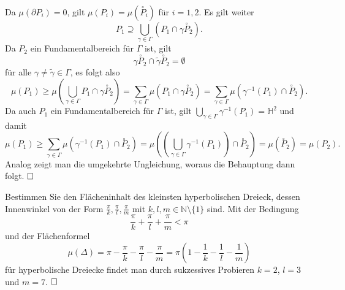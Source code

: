 \documentclass[11pt]{book}
\numberwithin{dummy}{section}
\theoremstyle{nonumberbreak}
\newenvironment{prob}[1][]{\ifthenelse{\equal{#1}{}}{\problem}{\problem[#1]}\rm}{\endproblem}
\newenvironment{sol}[1][]{\ifthenelse{\equal{#1}{}}{\solution}{\solution[#1]}\rm}{\endsolution}
\newcommand{\He}{\mathbb{H}}
\begin{document}
\begin{spacing}{1.4}
\begin{prob}
\begin{sol}
Da $\mu(\partial P_i)=0$, gilt $\mu(P_i)= \mu(\overset{\circ}{P}_i)$ für $i=1,2$. Es gilt weiter 
$$P_1 \supseteq \bigcup_{\gamma \in \Gamma} (P_1 \cap \gamma \overset{\circ}{P}_2).$$
Da $P_2$ ein Fundamentalbereich für $\Gamma$ ist, gilt 
$$\gamma \overset{\circ}{P}_2 \cap \tilde{\gamma} \overset{\circ}{P}_2 = \emptyset$$
für alle $\gamma \neq \tilde{\gamma}\in \Gamma$, es folgt also
$$\mu(P_1)\geqslant \mu\left( \bigcup_{\gamma \in \Gamma} P_1 \cap \gamma \overset{\circ}{P}_2\right) = \sum_{\gamma \in \Gamma} \mu\left(P_1 \cap \gamma \overset{\circ}{P}_2\right) = \sum_{\gamma \in \Gamma} \mu(\gamma^{-1}(P_1) \cap \overset{\circ}{P}_2).$$
Da auch $P_1$ ein Fundamentalbereich für $\Gamma$ ist, gilt $\bigcup_{\gamma \in \Gamma} \gamma^{-1}(P_1) = \He^2$ und damit 
$$\mu(P_1) \geqslant \sum_{\gamma \in \Gamma}\mu(\gamma^{-1}(P_1) \cap \overset{\circ}{P}_2) = \mu\left( \left( \bigcup_{\gamma \in \Gamma} \gamma^{-1}(P_1)\right) \cap \overset{\circ}{P}_2\right) = \mu(\overset{\circ}{P}_2) = \mu(P_2).$$
Analog zeigt man die umgekehrte Ungleichung, woraus die Behauptung dann folgt. $\hfill \Box$
\end{sol}

\end{prob}


\begin{prob}   %
Bestimmen Sie den Flächeninhalt des kleinsten hyperbolischen Dreieck, dessen Innenwinkel von der Form $\frac{\pi}{k}, \frac{\pi}{l}, \frac{\pi}{m}$ mit $k,l,m \in \mathbb{N}\setminus \{1\}$ sind.
\begin{sol}
Mit der Bedingung
$$\frac{\pi}{k} + \frac{\pi}{l} + \frac{\pi}{m} <\pi$$
und der Flächenformel
$$\mu(\Delta)= \pi-\frac{\pi}{k}-\frac{\pi}{l}-\frac{\pi}{m} = \pi\left( 1- \frac{1}{k} - \frac{1}{l}- \frac{1}{m}\right)$$
für hyperbolische Dreiecke findet man durch sukzessives Probieren $k=2$, $l=3$ und $m=7$. $\hfill \Box$
\end{sol}
\end{prob}
























\newpage





\end{spacing}
\end{document}
